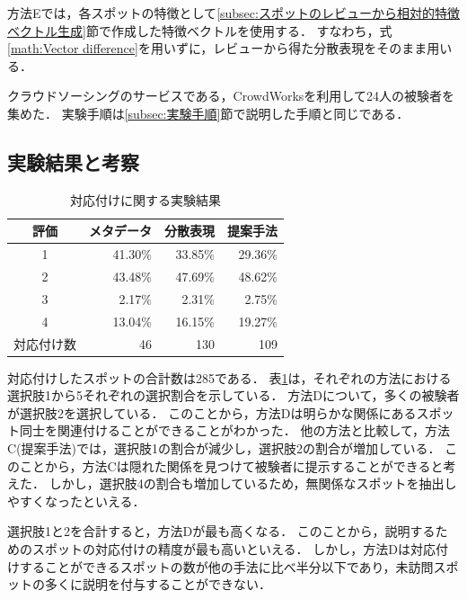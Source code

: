 \documentclass[submit]{ipsj}
\begin{document}
方法Eでは，各スポットの特徴として\ref{subsec:スポットのレビューから相対的特徴ベクトル生成}節で作成した特徴ベクトルを使用する．
すなわち，式\ref{math:Vector difference}を用いずに，レビューから得た分散表現をそのまま用いる．

クラウドソーシングのサービスである，CrowdWorksを利用して24人の被験者を集めた．
実験手順は\ref{subsec:実験手順}節で説明した手順と同じである．

\subsection{実験結果と考察}

\begin{table}[t]
  \caption{対応付けに関する実験結果}
  \label{table:対応付けに関する実験結果}
  \centering
  \begin{tabular}{c|r|r|r}
  \hline
  評価 & \multicolumn{1}{c|}{メタデータ} & \multicolumn{1}{c|}{分散表現} & \multicolumn{1}{c}{提案手法} \\ \hline
  1  & 41.30\%                    & 33.85\%                    & 29.36\% \\
  2  & 43.48\%                    & 47.69\%                    & 48.62\% \\
  3  & 2.17\%                     & 2.31\%                     & 2.75\% \\
  4  & 13.04\%                    & 16.15\%                    & 19.27\% \\
  \hline
  対応付け数  & 46                    & 130                    & 109 \\
   \hline
  \end{tabular}
\end{table}

対応付けしたスポットの合計数は285である．
表\ref{table:対応付けに関する実験結果}は，それぞれの方法における選択肢1から5それぞれの選択割合を示している．
方法Dについて，多くの被験者が選択肢2を選択している．
このことから，方法Dは明らかな関係にあるスポット同士を関連付けることができることがわかった．
他の方法と比較して，方法C(提案手法)では，選択肢1の割合が減少し，選択肢2の割合が増加している．
このことから，方法Cは隠れた関係を見つけて被験者に提示することができると考えた．
しかし，選択肢4の割合も増加しているため，無関係なスポットを抽出しやすくなったといえる．

選択肢1と2を合計すると，方法Dが最も高くなる．
このことから，説明するためのスポットの対応付けの精度が最も高いといえる．
しかし，方法Dは対応付けすることができるスポットの数が他の手法に比べ半分以下であり，未訪問スポットの多くに説明を付与することができない．
\end{document}
